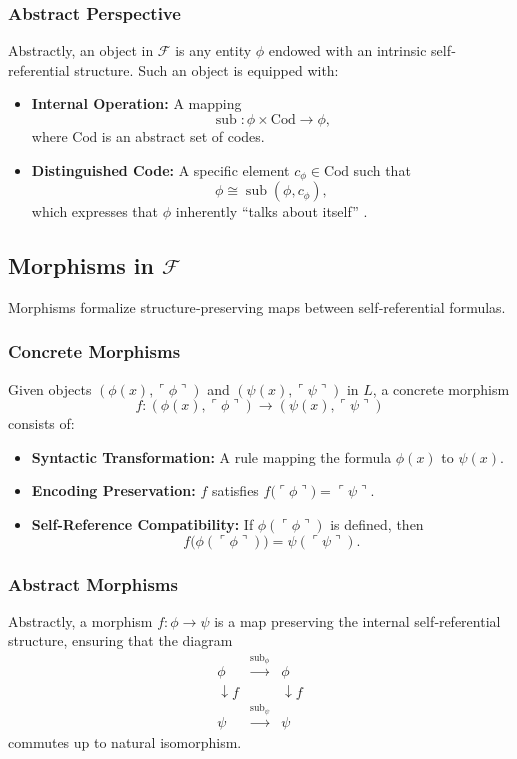 \documentclass[12pt]{amsart}
\theoremstyle{plain}
\theoremstyle{definition}
\theoremstyle{remark}
\begin{document}
\subsubsection{Abstract Perspective}
Abstractly, an object in $\mathcal{F}$ is any entity $\phi$ endowed with an intrinsic self‐referential structure. Such an object is equipped with:
\begin{itemize}[leftmargin=*, label={\textbullet}]
    \item \textbf{Internal Operation:} A mapping
    \[
    \operatorname{sub}: \phi \times \mathrm{Cod} \to \phi,
    \]
    where $\mathrm{Cod}$ is an abstract set of codes.
    \item \textbf{Distinguished Code:} A specific element $c_\phi \in \mathrm{Cod}$ such that
    \[
    \phi \cong \operatorname{sub}(\phi, c_\phi),
    \]
    which expresses that $\phi$ inherently “talks about itself” \cite{Brouwer1911}.
\end{itemize}

\subsection{Morphisms in $\mathcal{F}$}
Morphisms formalize structure‐preserving maps between self‐referential formulas.

\subsubsection{Concrete Morphisms}
Given objects $(\phi(x), \ulcorner \phi \urcorner)$ and $(\psi(x), \ulcorner \psi \urcorner)$ in $L$, a concrete morphism
\[
f: (\phi(x), \ulcorner \phi \urcorner) \to (\psi(x), \ulcorner \psi \urcorner)
\]
consists of:
\begin{itemize}[leftmargin=*, label={\textbullet}]
    \item \textbf{Syntactic Transformation:} A rule mapping the formula $\phi(x)$ to $\psi(x)$.
    \item \textbf{Encoding Preservation:} $f$ satisfies $f\bigl(\ulcorner \phi \urcorner\bigr) = \ulcorner \psi \urcorner$.
    \item \textbf{Self-Reference Compatibility:} If $\phi(\ulcorner \phi \urcorner)$ is defined, then
    \[
    f\bigl(\phi(\ulcorner \phi \urcorner)\bigr) = \psi(\ulcorner \psi \urcorner).
    \]
\end{itemize}

\subsubsection{Abstract Morphisms}
Abstractly, a morphism $f: \phi \to \psi$ is a map preserving the internal self‐referential structure, ensuring that the diagram
\[
\begin{array}{ccc}
\phi & \xrightarrow{\operatorname{sub}_\phi} & \phi \\
\downarrow{f} &  & \downarrow{f} \\
\psi & \xrightarrow{\operatorname{sub}_\psi} & \psi 
\end{array}
\]
commutes up to natural isomorphism.
\end{document}
